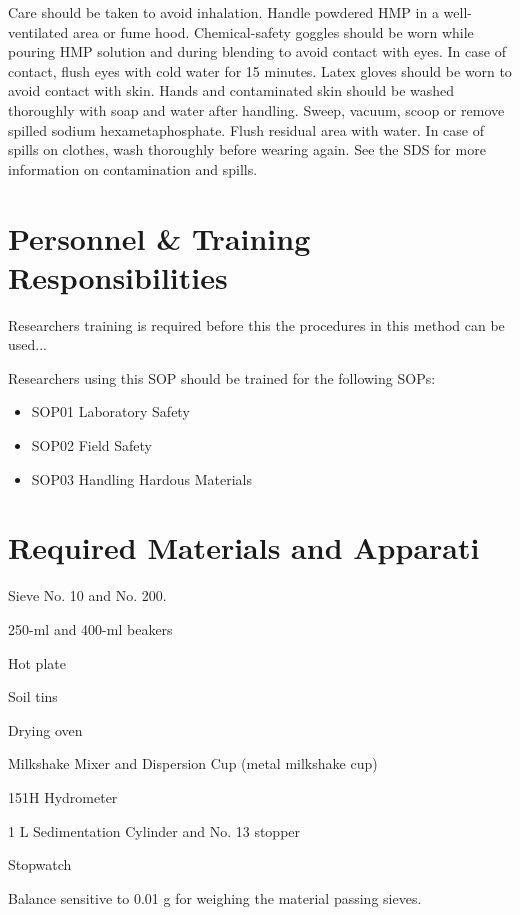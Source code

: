 \documentclass[12pt]{../SOP3_alpha}
\begin{document}
\NP Care should be taken to avoid inhalation. Handle powdered HMP in a well-ventilated area or fume hood. Chemical-safety goggles should be worn while pouring HMP solution and during blending to avoid contact with eyes. In case of contact, flush eyes with cold water for 15 minutes. Latex gloves should be worn to avoid contact with skin. Hands and contaminated skin should be washed thoroughly with soap and water after handling. Sweep, vacuum, scoop or remove spilled sodium hexametaphosphate. Flush residual area with water. In case of spills on clothes, wash thoroughly before wearing again. See the SDS for more information on contamination and spills.

\section{Personnel \& Training Responsibilities}

\NP Researchers training is required before this the procedures in this method can be used... 

\NP Researchers using this SOP should be trained for the following SOPs:

\begin{itemize}
  \item SOP01 Laboratory Safety
  \item SOP02 Field Safety
  \item SOP03 Handling Hardous Materials
\end{itemize}

\section{Required Materials and Apparati}

\begin{enumerate*}
	\item Sieve No. 10 and No. 200.
	\item 250-ml and 400-ml beakers
	\item Hot plate
	\item Soil tins
	\item Drying oven
	\item Milkshake Mixer and Dispersion Cup (metal milkshake cup)	
	\item 151H Hydrometer
	\item 1 L Sedimentation Cylinder and No. 13 stopper 
	\item Stopwatch
	\item Balance sensitive to 0.01 g for weighing the material passing sieves.
\end{enumerate*}
\end{document}
